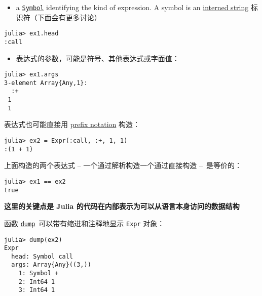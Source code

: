 \begin{itemize}
\item a \hyperlink{18332791376992528422}{\texttt{Symbol}} identifying the kind of expression. A symbol is an \href{https://en.wikipedia.org/wiki/String\_interning}{interned string} 标识符（下面会有更多讨论）

\end{itemize}



\begin{verbatim}
julia> ex1.head
:call
\end{verbatim}



\begin{itemize}
\item 表达式的参数，可能是符号、其他表达式或字面值：

\end{itemize}



\begin{verbatim}
julia> ex1.args
3-element Array{Any,1}:
  :+
 1
 1
\end{verbatim}



表达式也可能直接用 \href{https://en.wikipedia.org/wiki/Polish\_notation}{prefix notation} 构造：




\begin{verbatim}
julia> ex2 = Expr(:call, :+, 1, 1)
:(1 + 1)
\end{verbatim}



上面构造的两个表达式 – 一个通过解析构造一个通过直接构造 – 是等价的：




\begin{verbatim}
julia> ex1 == ex2
true
\end{verbatim}



\textbf{这里的关键点是 Julia 的代码在内部表示为可以从语言本身访问的数据结构}



函数 \hyperlink{15981569052160951906}{\texttt{dump}} 可以带有缩进和注释地显示 \texttt{Expr} 对象：




\begin{verbatim}
julia> dump(ex2)
Expr
  head: Symbol call
  args: Array{Any}((3,))
    1: Symbol +
    2: Int64 1
    3: Int64 1
\end{verbatim}



